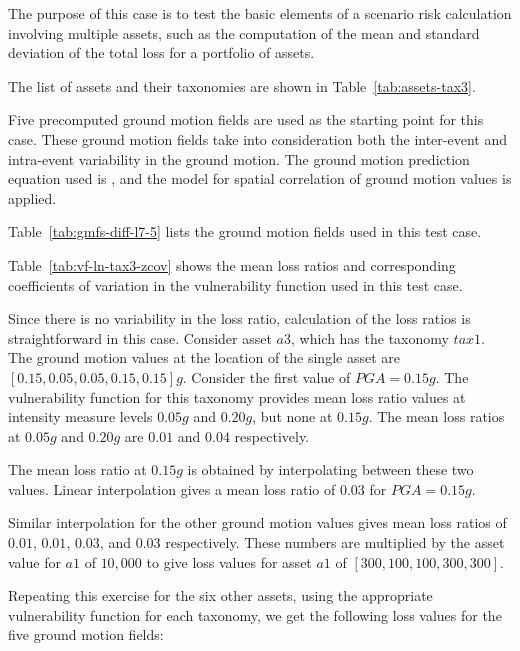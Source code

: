 The purpose of this case is to test the basic elements of a scenario risk calculation involving multiple assets, such as the computation of the mean and standard deviation of the total loss for a portfolio of assets.


The list of assets and their taxonomies are shown in Table~\ref{tab:assets-tax3}.

Five precomputed ground motion fields are used as the starting point for this case. These ground motion fields take into consideration both the inter-event and intra-event variability in the ground motion. The ground motion prediction equation used is \citet{boore2008}, and the \citet{jayaram2009} model for spatial correlation of ground motion values is applied.



Table~\ref{tab:gmfs-diff-l7-5} lists the ground motion fields used in this test case.




Table~\ref{tab:vf-ln-tax3-zcov} shows the mean loss ratios and corresponding coefficients of variation in the vulnerability function used in this test case.

Since there is no variability in the loss ratio, calculation of the loss ratios is straightforward in this case. Consider asset $a3$, which has the taxonomy $tax1$.  The ground motion values at the location of the single asset are $[0.15, 0.05, 0.05, 0.15, 0.15] g$. Consider the first value of $PGA = 0.15 g$. The vulnerability function for this taxonomy provides mean loss ratio values at intensity measure levels $0.05 g$ and $0.20 g$, but none at $0.15 g$. The mean loss ratios at $0.05 g$ and $0.20 g$ are $0.01$ and $0.04$ respectively.

The mean loss ratio at $0.15 g$ is obtained by interpolating between these two values. Linear interpolation gives a mean loss ratio of $0.03$ for $PGA = 0.15 g$.

Similar interpolation for the other ground motion values gives mean loss ratios of $0.01$, $0.01$, $0.03$, and $0.03$ respectively. These numbers are multiplied by the asset value for $a1$ of $10,000$ to give loss values for asset $a1$ of $[300, 100, 100, 300, 300]$.

Repeating this exercise for the six other assets, using the appropriate vulnerability function for each taxonomy, we get the following loss values for the five ground motion fields:

